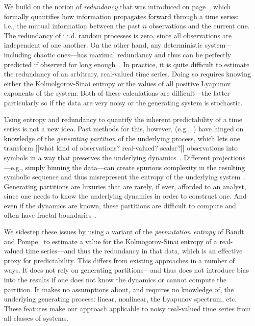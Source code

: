 We build on the notion of \emph{redundancy} that was introduced on
page~\pageref{page:redundancy}, which formally quantifies how
information propagates forward through a time series:
i.e., the mutual information between the past $n$ observations and the
current one.
% 
The redundancy of i.i.d. random processes is zero, since all
observations are independent of one another.  On the other hand, any
deterministic system---including chaotic ones---has maximal redundancy
and thus can be perfectly predicted if observed for long
enough~\cite{weigend-book}.  In practice, it is quite difficult to
estimate the redundancy of an arbitrary, real-valued time series.
Doing so requires knowing either the Kolmolgorov-Sinai entropy or the
values of all positive Lyapunov exponents of the system.  Both of
these calculations are difficult---the latter particularly so if the
data are very noisy or the generating system is stochastic.

Using entropy and redundancy to quantify the inherent predictability
of a time series is not a new idea.  Past methods for this, however,
(e.g.,~\cite{Shannon1951, mantegna1994linguistic}) have hinged on
knowledge of the \emph{generating partition} of the underlying
process, which lets one transform {\color{red}[[what kind of
      observations?  real-valued? scalar?]]}  observations into
symbols in a way that preserves the underlying dynamics~\cite{lind95}.
Different projections---e.g., simply binning the data---can create
spurious complexity in the resulting symbolic sequence and thus
misrepresent the entropy of the underlying system~\cite{bollt2001}.
Generating partitions are luxuries that are rarely, if ever, afforded
to an analyst, since one needs to know the underlying dynamics in
order to construct one.  And even if the dynamics are known, these
partitions are difficult to compute and often have fractal
boundaries~\cite{eisele1999}.

We sidestep these issues by using a variant of the \emph{permutation
  entropy} of Bandt and Pompe~\cite{bandt2002per} to estimate a value
for the Kolmogorov-Sinai entropy of a real-valued time series---and
thus the redundancy in that data, which is an effective proxy for
predictability.  This differs from existing approaches in a number of
ways.  It does not rely on generating partitions---and thus does not
introduce bias into the results if one does not know the dynamics or
cannot compute the partition.  It makes no assumptions about, and
requires no knowledge of, the underlying generating process: linear,
nonlinear, the Lyapunov spectrum, etc.  These features make our
approach applicable to noisy real-valued time series from all classes
of systems.

